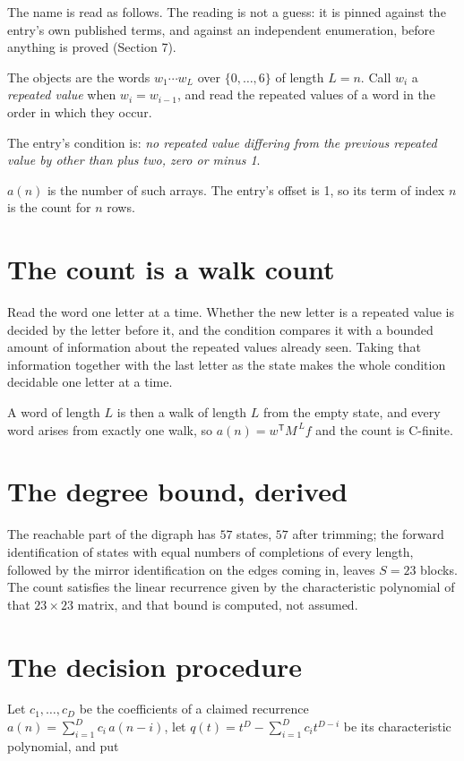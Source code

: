 \documentclass[11pt]{article}
\theoremstyle{definition}
\begin{document}
The name is read as follows. The reading is not a guess: it is pinned against the entry's own published terms, and against an independent enumeration, before anything is proved (Section 7).

The objects are the words $w_1\cdots w_L$ over $\{0,\dots,6\}$ of length $L = n$. Call $w_i$ a {\itshape repeated value} when $w_i = w_{i-1}$, and read the repeated values of a word in the order in which they occur.

The entry's condition is: {\itshape no repeated value differing from the previous repeated value by other than plus two, zero or minus 1}.

$a(n)$ is the number of such arrays. The entry's offset is 1, so its term of index $n$ is the count for $n$ rows.

\section{The count is a walk count}

Read the word one letter at a time. Whether the new letter is a repeated value is decided by the letter before it, and the condition compares it with a bounded amount of information about the repeated values already seen. Taking that information together with the last letter as the state makes the whole condition decidable one letter at a time.

A word of length $L$ is then a walk of length $L$ from the empty state, and every word arises from exactly one walk, so $a(n) = w^{\mathsf T}M^{\,L}f$ and the count is C-finite.

\section{The degree bound, derived}

The reachable part of the digraph has $57$ states, $57$ after trimming; the forward identification of states with equal numbers of completions of every length, followed by the mirror identification on the edges coming in, leaves $S = 23$ blocks. The count satisfies the linear recurrence given by the characteristic polynomial of that $23\times23$ matrix, and that bound is computed, not assumed.

\section{The decision procedure}

Let $c_1,\dots,c_D$ be the coefficients of a claimed recurrence $a(n) = \sum_{i=1}^{D} c_i\,a(n-i)$, let $q(t) = t^{D} - \sum_{i=1}^{D} c_i t^{D-i}$ be its characteristic polynomial, and put
\end{document}
